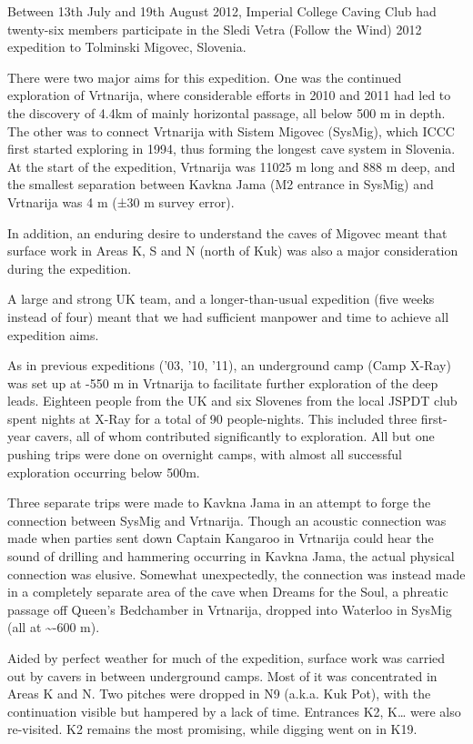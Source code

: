 Between 13th July and 19th August 2012, Imperial College Caving Club had
twenty-six members participate in the Sledi Vetra (Follow the Wind) 2012
expedition to Tolminski Migovec, Slovenia.

There were two major aims for this expedition. One was the continued
exploration of Vrtnarija, where considerable efforts in 2010 and 2011
had led to the discovery of 4.4km of mainly horizontal passage, all
below 500 m in depth. The other was to connect Vrtnarija with Sistem
Migovec (SysMig), which ICCC first started exploring in 1994, thus
forming the longest cave system in Slovenia. At the start of the
expedition, Vrtnarija was 11025 m long and 888 m deep, and the smallest
separation between Kavkna Jama (M2 entrance in SysMig) and Vrtnarija was
4 m (±30 m survey error).

In addition, an enduring desire to understand the caves of Migovec meant
that surface work in Areas K, S and N (north of Kuk) was also a major
consideration during the expedition.

A large and strong UK team, and a longer-than-usual expedition (five
weeks instead of four) meant that we had sufficient manpower and time to
achieve all expedition aims.

As in previous expeditions ('03, '10, '11), an underground camp (Camp
X-Ray) was set up at -550 m in Vrtnarija to facilitate further
exploration of the deep leads. Eighteen people from the UK and six
Slovenes from the local JSPDT club spent nights at X-Ray for a total of
90 people-nights. This included three first-year cavers, all of whom
contributed significantly to exploration. All but one pushing trips were
done on overnight camps, with almost all successful exploration
occurring below 500m.

Three separate trips were made to Kavkna Jama in an attempt to forge the
connection between SysMig and Vrtnarija. Though an acoustic connection
was made when parties sent down Captain Kangaroo in Vrtnarija could hear
the sound of drilling and hammering occurring in Kavkna Jama, the actual
physical connection was elusive. Somewhat unexpectedly, the connection
was instead made in a completely separate area of the cave when Dreams
for the Soul, a phreatic passage off Queen's Bedchamber in Vrtnarija,
dropped into Waterloo in SysMig (all at \textasciitilde{}-600 m).

Aided by perfect weather for much of the expedition, surface work was
carried out by cavers in between underground camps. Most of it was
concentrated in Areas K and N. Two pitches were dropped in N9 (a.k.a.
Kuk Pot), with the continuation visible but hampered by a lack of time.
Entrances K2, K\ldots{} were also re-visited. K2 remains the most
promising, while digging went on in K19.

